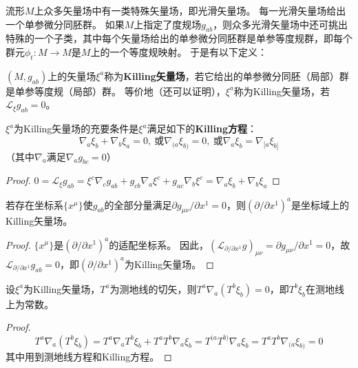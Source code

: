流形$M$上众多矢量场中有一类特殊矢量场，即光滑矢量场。
每一光滑矢量场给出一个单参微分同胚群。
如果$M$上指定了度规场$g_{ab}$，则众多光滑矢量场中还可挑出特殊的一个子类，其中每个矢量场给出的单参微分同胚群是单参等度规群，即每个群元$\phi_t \colon M \to M$是$M$上的一个等度规映射。
于是有以下定义：

\begin{definition}
	$(M, g_{ab})$上的矢量场$\xi^a$称为\textbf{Killing矢量场}，若它给出的单参微分同胚（局部）群是单参等度规（局部）群。
	等价地（还可以证明），$\xi^a$称为Killing矢量场，若$\mathscr{L}_{\xi}g_{ab} = 0$。
\end{definition}

\begin{theorem}
	$\xi^a$为Killing矢量场的充要条件是$\xi^a$满足如下的\textbf{Killing方程}：
	$$\nabla_a\xi_b + \nabla_b\xi_a = 0, ~ \text{或} \nabla_{(a}\xi_{b)} = 0, ~ \text{或} \nabla_a\xi_b = \nabla_{[a}\xi_{b]}$$
	（其中$\nabla_a$满足$\nabla_ag_{bc} = 0$）
\end{theorem}

\begin{proof}
	$0 = \mathscr{L}_{\xi}g_{ab} = \xi^c\nabla_cg_{ab} + g_{cb}\nabla_a\xi^c + g_{ac}\nabla_b\xi^c = \nabla_a\xi_b + \nabla_b\xi_a$
\end{proof}

\begin{theorem}
	若存在坐标系$\{x^\mu\}$使$g_{ab}$的全部分量满足$\partial g_{\mu\nu} / \partial x^1 = 0$，则$(\partial / \partial x^1)^a$是坐标域上的Killing矢量场。
\end{theorem}

\begin{proof}
	$\{x^\mu\}$是$(\partial / \partial x^1)^a$的适配坐标系。
	因此，$(\mathscr{L}_{\partial / \partial x^1}g)_{\mu\nu} = \partial g_{\mu\nu} / \partial x^1 = 0$，故$\mathscr{L}_{\partial / \partial x^1}g_{ab} = 0$，即$(\partial / \partial x^1)^a$为Killing矢量场。
\end{proof}

\begin{theorem}
	设$\xi^a$为Killing矢量场，$T^a$为测地线的切矢，则$T^a\nabla_a(T^b\xi_b) = 0$，即$T^b\xi_b$在测地线上为常数。
\end{theorem}

\begin{proof}
	$$T^a\nabla_a(T^b\xi_b) = T^a\nabla_aT^b\xi_b + T^aT^b\nabla_a\xi_b = T^{(a}T^{b)}\nabla_{a}\xi_{b} = T^{a}T^{b}\nabla_{(a}\xi_{b)} = 0$$
	其中用到测地线方程和Killing方程。
\end{proof}


